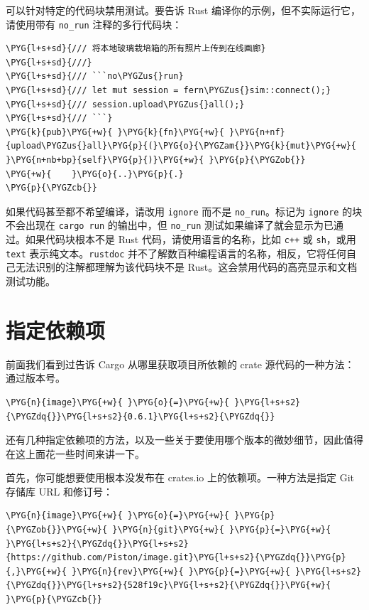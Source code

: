 可以针对特定的代码块禁用测试。要告诉 Rust 编译你的示例，但不实际运行它，请使用带有 \texttt{no\_run} 注释的多行代码块：

\begin{Verbatim}[commandchars=\\\{\},breaklines=true,breakanywhere=true,fontsize=\codefont,xleftmargin=17bp]
\PYG{l+s+sd}{/// 将本地玻璃栽培箱的所有照片上传到在线画廊}
\PYG{l+s+sd}{///}
\PYG{l+s+sd}{/// ```no\PYGZus{}run}
\PYG{l+s+sd}{/// let mut session = fern\PYGZus{}sim::connect();}
\PYG{l+s+sd}{/// session.upload\PYGZus{}all();}
\PYG{l+s+sd}{/// ```}
\PYG{k}{pub}\PYG{+w}{ }\PYG{k}{fn}\PYG{+w}{ }\PYG{n+nf}{upload\PYGZus{}all}\PYG{p}{(}\PYG{o}{\PYGZam{}}\PYG{k}{mut}\PYG{+w}{ }\PYG{n+nb+bp}{self}\PYG{p}{)}\PYG{+w}{ }\PYG{p}{\PYGZob{}}
\PYG{+w}{    }\PYG{o}{..}\PYG{p}{.}
\PYG{p}{\PYGZcb{}}
\end{Verbatim}

如果代码甚至都不希望编译，请改用 \texttt{ignore} 而不是 \texttt{no\_run}。标记为 \texttt{ignore} 的块不会出现在 \texttt{cargo run} 的输出中，但 \texttt{no\_run} 测试如果编译了就会显示为已通过。如果代码块根本不是 Rust 代码，请使用语言的名称，比如 \texttt{c++} 或 \texttt{sh}，或用 \texttt{text} 表示纯文本。\texttt{rustdoc} 并不了解数百种编程语言的名称，相反，它将任何自己无法识别的注解都理解为该代码块不是 Rust。这会禁用代码的高亮显示和文档测试功能。

\section{指定依赖项}

前面我们看到过告诉 Cargo 从哪里获取项目所依赖的 crate 源代码的一种方法：通过版本号。

\begin{Verbatim}[commandchars=\\\{\},breaklines=true,breakanywhere=true,fontsize=\codefont,xleftmargin=17bp]
\PYG{n}{image}\PYG{+w}{ }\PYG{o}{=}\PYG{+w}{ }\PYG{l+s+s2}{\PYGZdq{}}\PYG{l+s+s2}{0.6.1}\PYG{l+s+s2}{\PYGZdq{}}
\end{Verbatim}

还有几种指定依赖项的方法，以及一些关于要使用哪个版本的微妙细节，因此值得在这上面花一些时间来讲一下。

首先，你可能想要使用根本没发布在 crates.io 上的依赖项。一种方法是指定 Git 存储库 URL 和修订号：

\begin{Verbatim}[commandchars=\\\{\},breaklines=true,breakanywhere=true,fontsize=\codefont,xleftmargin=17bp]
\PYG{n}{image}\PYG{+w}{ }\PYG{o}{=}\PYG{+w}{ }\PYG{p}{\PYGZob{}}\PYG{+w}{ }\PYG{n}{git}\PYG{+w}{ }\PYG{p}{=}\PYG{+w}{ }\PYG{l+s+s2}{\PYGZdq{}}\PYG{l+s+s2}{https://github.com/Piston/image.git}\PYG{l+s+s2}{\PYGZdq{}}\PYG{p}{,}\PYG{+w}{ }\PYG{n}{rev}\PYG{+w}{ }\PYG{p}{=}\PYG{+w}{ }\PYG{l+s+s2}{\PYGZdq{}}\PYG{l+s+s2}{528f19c}\PYG{l+s+s2}{\PYGZdq{}}\PYG{+w}{ }\PYG{p}{\PYGZcb{}}
\end{Verbatim}

